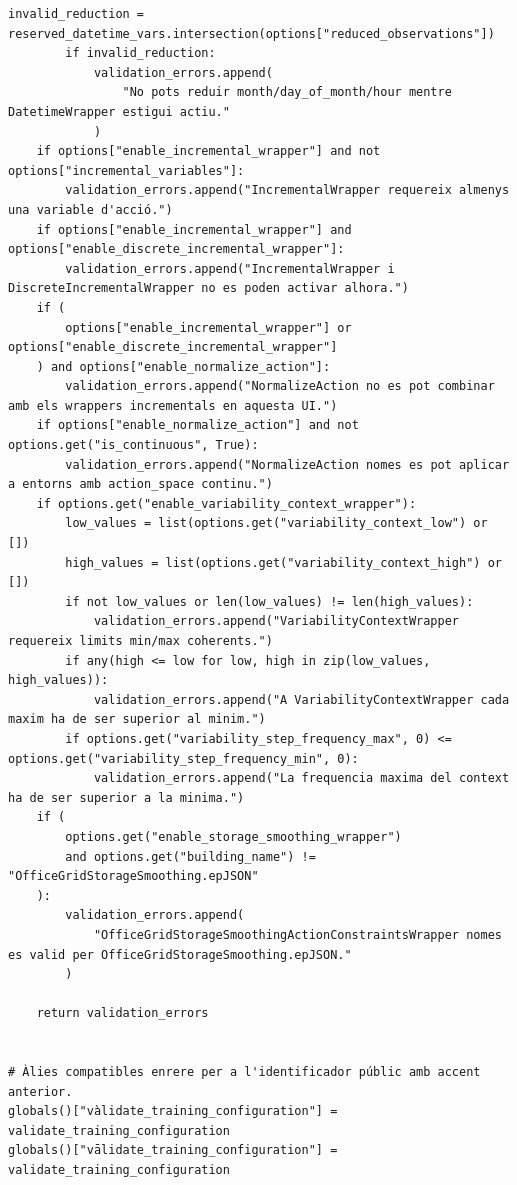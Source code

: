 \documentclass[10pt,a4paper]{article}
\begin{document}
\begin{lstlisting}[style=studioPython,caption={backend/entrenar\_agent\_rewards.py},label={lst:backend-entrenar-agent-rewards-py}]
        invalid_reduction = reserved_datetime_vars.intersection(options["reduced_observations"])
        if invalid_reduction:
            validation_errors.append(
                "No pots reduir month/day_of_month/hour mentre DatetimeWrapper estigui actiu."
            )
    if options["enable_incremental_wrapper"] and not options["incremental_variables"]:
        validation_errors.append("IncrementalWrapper requereix almenys una variable d'acció.")
    if options["enable_incremental_wrapper"] and options["enable_discrete_incremental_wrapper"]:
        validation_errors.append("IncrementalWrapper i DiscreteIncrementalWrapper no es poden activar alhora.")
    if (
        options["enable_incremental_wrapper"] or options["enable_discrete_incremental_wrapper"]
    ) and options["enable_normalize_action"]:
        validation_errors.append("NormalizeAction no es pot combinar amb els wrappers incrementals en aquesta UI.")
    if options["enable_normalize_action"] and not options.get("is_continuous", True):
        validation_errors.append("NormalizeAction nomes es pot aplicar a entorns amb action_space continu.")
    if options.get("enable_variability_context_wrapper"):
        low_values = list(options.get("variability_context_low") or [])
        high_values = list(options.get("variability_context_high") or [])
        if not low_values or len(low_values) != len(high_values):
            validation_errors.append("VariabilityContextWrapper requereix limits min/max coherents.")
        if any(high <= low for low, high in zip(low_values, high_values)):
            validation_errors.append("A VariabilityContextWrapper cada maxim ha de ser superior al minim.")
        if options.get("variability_step_frequency_max", 0) <= options.get("variability_step_frequency_min", 0):
            validation_errors.append("La frequencia maxima del context ha de ser superior a la minima.")
    if (
        options.get("enable_storage_smoothing_wrapper")
        and options.get("building_name") != "OfficeGridStorageSmoothing.epJSON"
    ):
        validation_errors.append(
            "OfficeGridStorageSmoothingActionConstraintsWrapper nomes es valid per OfficeGridStorageSmoothing.epJSON."
        )

    return validation_errors


# Àlies compatibles enrere per a l'identificador públic amb accent anterior.
globals()["vàlidate_training_configuration"] = validate_training_configuration
globals()["vālidate_training_configuration"] = validate_training_configuration



\end{lstlisting}
\end{document}
